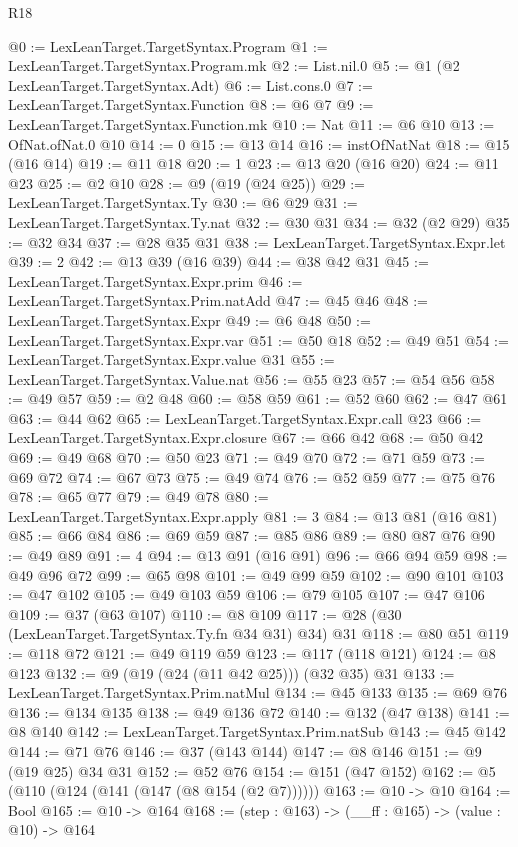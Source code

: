 \begin{lexlean}{R18}
\begin{coremodule}
@0 := LexLeanTarget.TargetSyntax.Program
@1 := LexLeanTarget.TargetSyntax.Program.mk
@2 := List.nil.{0}
@5 := @1 (@2 LexLeanTarget.TargetSyntax.Adt)
@6 := List.cons.{0}
@7 := LexLeanTarget.TargetSyntax.Function
@8 := @6 @7
@9 := LexLeanTarget.TargetSyntax.Function.mk
@10 := Nat
@11 := @6 @10
@13 := OfNat.ofNat.{0} @10
@14 := 0
@15 := @13 @14
@16 := instOfNatNat
@18 := @15 (@16 @14)
@19 := @11 @18
@20 := 1
@23 := @13 @20 (@16 @20)
@24 := @11 @23
@25 := @2 @10
@28 := @9 (@19 (@24 @25))
@29 := LexLeanTarget.TargetSyntax.Ty
@30 := @6 @29
@31 := LexLeanTarget.TargetSyntax.Ty.nat
@32 := @30 @31
@34 := @32 (@2 @29)
@35 := @32 @34
@37 := @28 @35 @31
@38 := LexLeanTarget.TargetSyntax.Expr.let
@39 := 2
@42 := @13 @39 (@16 @39)
@44 := @38 @42 @31
@45 := LexLeanTarget.TargetSyntax.Expr.prim
@46 := LexLeanTarget.TargetSyntax.Prim.natAdd
@47 := @45 @46
@48 := LexLeanTarget.TargetSyntax.Expr
@49 := @6 @48
@50 := LexLeanTarget.TargetSyntax.Expr.var
@51 := @50 @18
@52 := @49 @51
@54 := LexLeanTarget.TargetSyntax.Expr.value @31
@55 := LexLeanTarget.TargetSyntax.Value.nat
@56 := @55 @23
@57 := @54 @56
@58 := @49 @57
@59 := @2 @48
@60 := @58 @59
@61 := @52 @60
@62 := @47 @61
@63 := @44 @62
@65 := LexLeanTarget.TargetSyntax.Expr.call @23
@66 := LexLeanTarget.TargetSyntax.Expr.closure
@67 := @66 @42
@68 := @50 @42
@69 := @49 @68
@70 := @50 @23
@71 := @49 @70
@72 := @71 @59
@73 := @69 @72
@74 := @67 @73
@75 := @49 @74
@76 := @52 @59
@77 := @75 @76
@78 := @65 @77
@79 := @49 @78
@80 := LexLeanTarget.TargetSyntax.Expr.apply
@81 := 3
@84 := @13 @81 (@16 @81)
@85 := @66 @84
@86 := @69 @59
@87 := @85 @86
@89 := @80 @87 @76
@90 := @49 @89
@91 := 4
@94 := @13 @91 (@16 @91)
@96 := @66 @94 @59
@98 := @49 @96 @72
@99 := @65 @98
@101 := @49 @99 @59
@102 := @90 @101
@103 := @47 @102
@105 := @49 @103 @59
@106 := @79 @105
@107 := @47 @106
@109 := @37 (@63 @107)
@110 := @8 @109
@117 := @28 (@30 (LexLeanTarget.TargetSyntax.Ty.fn @34 @31) @34) @31
@118 := @80 @51
@119 := @118 @72
@121 := @49 @119 @59
@123 := @117 (@118 @121)
@124 := @8 @123
@132 := @9 (@19 (@24 (@11 @42 @25))) (@32 @35) @31
@133 := LexLeanTarget.TargetSyntax.Prim.natMul
@134 := @45 @133
@135 := @69 @76
@136 := @134 @135
@138 := @49 @136 @72
@140 := @132 (@47 @138)
@141 := @8 @140
@142 := LexLeanTarget.TargetSyntax.Prim.natSub
@143 := @45 @142
@144 := @71 @76
@146 := @37 (@143 @144)
@147 := @8 @146
@151 := @9 (@19 @25) @34 @31
@152 := @52 @76
@154 := @151 (@47 @152)
@162 := @5 (@110 (@124 (@141 (@147 (@8 @154 (@2 @7))))))
@163 := @10 -> @10
@164 := Bool
@165 := @10 -> @164
@168 := (step : @163) -> (__ff : @165) -> (value : @10) -> @164

\end{coremodule}
\end{lexlean}
